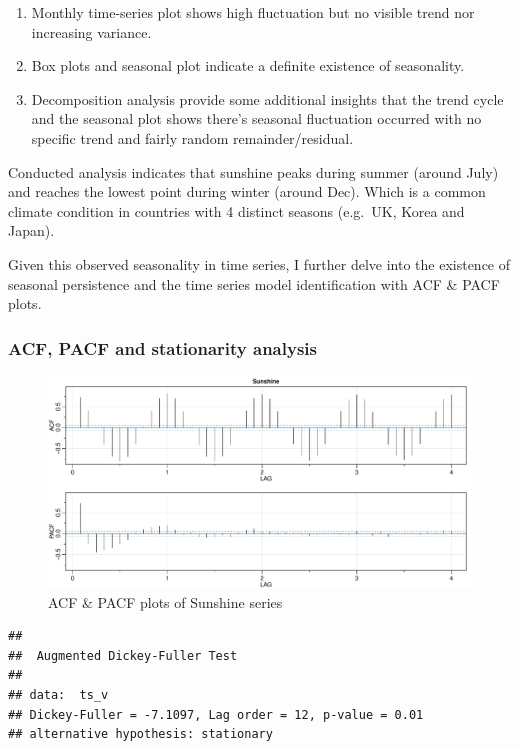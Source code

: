 \documentclass[
  11pt,
]{article}
\providecommand{\tightlist}{%
  \setlength{\itemsep}{0pt}\setlength{\parskip}{0pt}}
\begin{document}
\begin{enumerate}
\def\labelenumi{\arabic{enumi}.}
\tightlist
\item
  Monthly time-series plot shows high fluctuation but no visible trend
  nor increasing variance.
\item
  Box plots and seasonal plot indicate a definite existence of
  seasonality.
\item
  Decomposition analysis provide some additional insights that the trend
  cycle and the seasonal plot shows there's seasonal fluctuation
  occurred with no specific trend and fairly random remainder/residual.
\end{enumerate}

Conducted analysis indicates that sunshine peaks during summer (around
July) and reaches the lowest point during winter (around Dec). Which is
a common climate condition in countries with 4 distinct seasons
(e.g.~UK, Korea and Japan).

Given this observed seasonality in time series, I further delve into the
existence of seasonal persistence and the time series model
identification with ACF \& PACF plots.

\newpage

\hypertarget{acf-pacf-and-stationarity-analysis}{%
\subsubsection{ACF, PACF and stationarity
analysis}\label{acf-pacf-and-stationarity-analysis}}

\begin{figure}
\centering
\includegraphics{ST422_files/figure-latex/unnamed-chunk-9-1.pdf}
\caption{ACF \& PACF plots of Sunshine series}
\end{figure}

\begin{verbatim}
## 
##  Augmented Dickey-Fuller Test
## 
## data:  ts_v
## Dickey-Fuller = -7.1097, Lag order = 12, p-value = 0.01
## alternative hypothesis: stationary
\end{verbatim}
\end{document}
